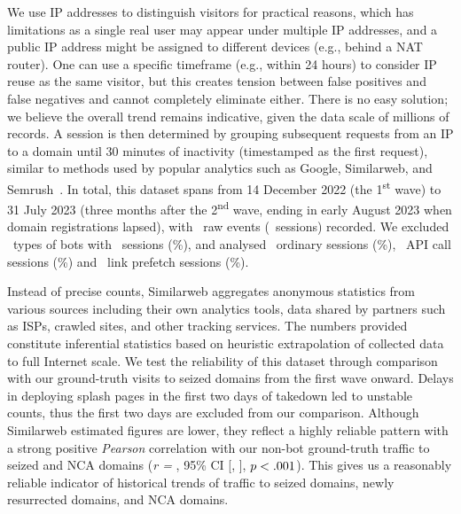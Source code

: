\documentclass[letterpaper,twocolumn,10pt]{article}
\begin{document}
We use IP addresses to distinguish visitors for practical reasons, which has limitations as a single real user may appear under multiple IP addresses, and a public IP address might be assigned to different devices (e.g., behind a NAT router). One can use a specific timeframe (e.g., within 24 hours) to consider IP reuse as the same visitor, but this creates tension between false positives and false negatives and cannot completely eliminate either. There is no easy solution; we believe the overall trend remains indicative, given the data scale of millions of records. A session is then determined by grouping subsequent requests from an IP to a domain until 30 minutes of inactivity (timestamped as the first request), similar to methods used by popular analytics such as Google, Similarweb, and Semrush~\cite{similarwebsessioncount,semrushsessioncount}. In total, this dataset spans from 14 December 2022 (the 1\textsuperscript{st} wave) to 31 July 2023 (three months after the 2\textsuperscript{nd} wave, ending in early August 2023 when domain registrations lapsed), with \BTnTotalRawEvent~raw events (\BTnTotalVisitSessions~sessions) recorded. We excluded \BTnTotalBotTypes~types of bots with \BTnbotVisits~sessions (\BTnbotVisitsProps\%), and analysed \BTnrealvisitVisits~ordinary sessions (\BTnrealvisitVisitsProps\%), \BTnapicallVisits~API call sessions (\BTnapicallVisitsProps\%) and \BTnprefetchVisits~link prefetch sessions (\BTnprefetchVisitsProps\%).

 Instead of precise counts, Similarweb aggregates anonymous statistics from various sources including their own analytics tools, data shared by partners such as ISPs, crawled sites, and other tracking services. The numbers provided constitute inferential statistics based on heuristic extrapolation of collected data to full Internet scale. We test the reliability of this dataset through comparison with our ground-truth visits to seized domains from the first wave onward. Delays in deploying splash pages in the first two days of takedown led to unstable counts, thus the first two days are excluded from our comparison. Although Similarweb estimated figures are lower, they reflect a highly reliable pattern with a strong positive \textit{Pearson} correlation with our non-bot ground-truth traffic to seized and NCA domains (\textit{r = \BTsimilarwebCorrelationCoefficient}, 95\% CI [\BTsimilarwebCorrelationCoefficientConfidenceIntervalLow, \BTsimilarwebCorrelationCoefficientConfidenceIntervalHigh], $p<{.001}$). This gives us a reasonably reliable indicator of historical trends of traffic to seized domains, newly resurrected domains, and NCA domains.
\end{document}
